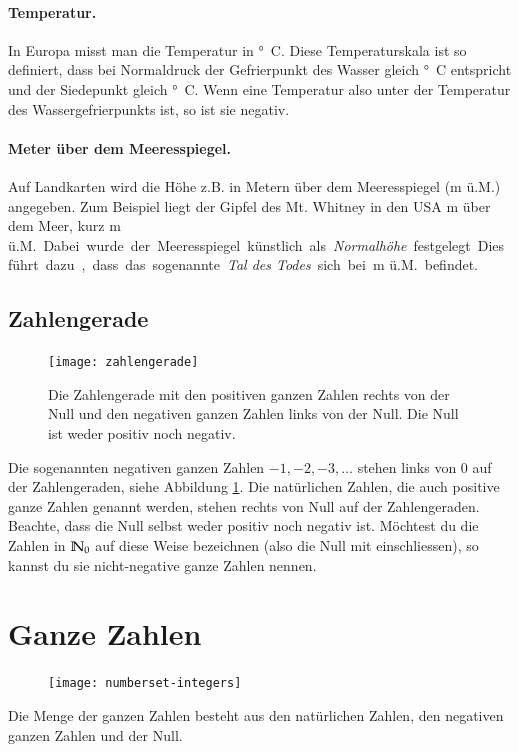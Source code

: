 \paragraph{Temperatur.}
In Europa misst man die Temperatur in \unit{°C}.
Diese Temperaturskala ist so definiert, dass bei Normaldruck der Gefrierpunkt des Wasser gleich \unit[0]{°C} entspricht und der Siedepunkt gleich \unit[100]{°C}.
Wenn eine Temperatur also unter der Temperatur des Wassergefrierpunkts ist, so ist sie negativ.

\paragraph{Meter über dem Meeresspiegel.}
Auf Landkarten wird die Höhe z.B. in Metern über dem Meeresspiegel (m ü.M.) angegeben.
Zum Beispiel liegt der Gipfel des Mt. Whitney in den USA \unit[4418]{m} über dem Meer, kurz \unit[4418]{m ü.M.}
Dabei wurde der Meeresspiegel künstlich als \emph{Normalhöhe} festgelegt.
Dies führt dazu, dass das sogenannte \emph{Tal des Todes} sich bei \unit[-86]{m ü.M.} befindet.

\subsection{Zahlengerade}
\begin{figure}[H]
	\texttt{[image: zahlengerade]}
	\caption{Die Zahlengerade mit den positiven ganzen Zahlen rechts von der Null und den negativen ganzen Zahlen links von der Null.
	Die Null ist weder positiv noch negativ.}
	\label{fig:zahlengerade-pos-neg}
\end{figure}

Die sogenannten negativen ganzen Zahlen $-1, -2, -3, \ldots$ stehen links von 0 auf der Zahlengeraden, siehe Abbildung \ref{fig:zahlengerade-pos-neg}.
Die natürlichen Zahlen, die auch positive ganze Zahlen genannt werden, stehen rechts von Null auf der Zahlengeraden. Beachte, dass die Null selbst weder positiv noch negativ ist.
Möchtest du die Zahlen in $\mathbb{N}_0$ auf diese Weise bezeichnen (also die Null mit einschliessen), so kannst du sie nicht-negative ganze Zahlen nennen.

\section{Ganze Zahlen}
\begin{figure}
	\vspace{-1cm}
	\texttt{[image: numberset-integers]}
	\vspace{-2cm}
\end{figure}
Die Menge der ganzen Zahlen besteht aus den natürlichen Zahlen, den negativen ganzen Zahlen und der Null.

